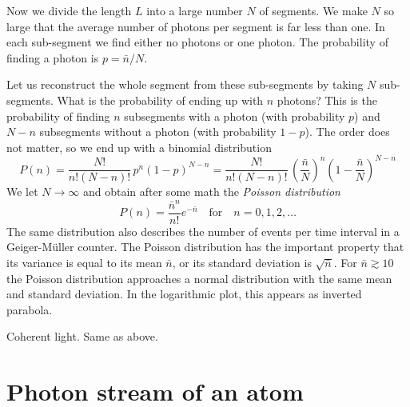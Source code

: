 Now we divide the length $L$ into a large number $N$ of segments. We make $N$ so large that the average number of photons per segment is far less than one. In each sub-segment we find either no photons or one photon. The probability of finding a photon is $p = \bar{n} / N$.


Let us reconstruct the whole segment from these sub-segments by taking $N$ sub-segments. What is the probability of ending up with $n$ photons? This is the probability of finding $n$ subsegments with a photon (with probability $p$) and $N-n$ subsegments without a photon (with probability $1-p$). The order does not matter, so we end up with a binomial distribution
\begin{equation}
    P(n) = \frac{N!}{n! (N -n)!} \, p^n (1-p)^{N-n}
 =
 \frac{N!}{n! (N -n)!} \, \left( \frac{\bar{n}}{N}\right)^n \left(1- \frac{\bar{n}}{N} \right)^{N-n} 
\end{equation}
We let  $N \rightarrow \infty$ and obtain after some math the \emph{Poisson distribution}
\begin{equation}
    P(n) = \frac{\bar{n}^n}{n!} e^{- \bar{n}} \quad \text{for} \quad n = 0, 1, 2, \dots
\end{equation}
The same distribution also describes the number of events per time interval in a Geiger-Müller counter. The Poisson distribution has the important property that its variance is equal to its mean $\bar{n}$, or its standard deviation is $\sqrt{\bar{n}}$. For $\bar{n} \gtrsim 10$ the Poisson distribution approaches a normal distribution with the same mean and standard deviation. In the logarithmic plot, this appears as inverted parabola. 

\begin{marginfigure}
    \caption{Coherent light. Same as above. }
\end{marginfigure}


\section{Photon stream of an atom}


